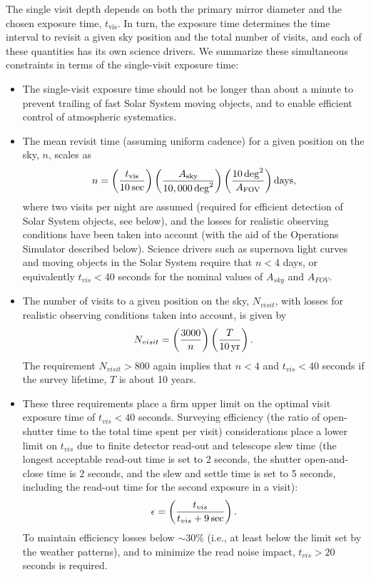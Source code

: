The single visit depth depends on both the primary mirror diameter and the
chosen exposure time, $t_\mathrm{vis}$. In turn, the exposure time
determines the time interval to revisit a given sky position and the total
number of visits, and each of these quantities has its own science
drivers. We summarize these simultaneous constraints in terms of the
single-visit exposure time:
\begin{itemize}
\item  The single-visit exposure time should not be longer than about a minute to
         prevent trailing of fast Solar System moving objects, and to enable efficient
         control of atmospheric systematics.
\item  The mean revisit time (assuming uniform cadence) for a given position
         on the sky, $n$, scales as
\begin{equation}
  n = \left( {t_\mathrm{vis} \over 10  \, \mathrm{sec}} \right)
      \left( { A_\mathrm{sky} \over 10,000  \, \mathrm{deg}^2} \right)
      \left( {10 \, \mathrm{deg}^2 \over  A_\mathrm{FOV}} \right) \mathrm{days},
\end{equation}
where two visits per night are assumed (required for efficient detection of
Solar System objects, see below), and the losses for realistic observing conditions
have been taken into account (with the aid of the Operations Simulator described below).
Science drivers such as supernova light curves and moving objects in the Solar System require
that $n<4$ days, or equivalently $t_{vis} < 40$ seconds for the nominal values
of $A_{sky} $ and $A_{FOV}$.
\item  The number of visits to a given position on the sky, $N_{visit}$,
with losses for realistic observing conditions taken into account,
is given by
\begin{equation}
      N_{visit} = \left( {3000 \over n} \right)
                    \left( { T \over 10 \, \mathrm{yr}} \right).
\end{equation}
The requirement $N_{visit}>800$ again implies that $n<4$ and
$t_{vis} < 40$ seconds if the survey lifetime, $T$ is about 10 years.
\item  These three requirements place a firm upper limit on the
optimal visit exposure time of $t_{vis} < 40$ seconds. Surveying
efficiency (the ratio of open-shutter time to the total
time spent per visit) considerations place a lower limit on
$t_{vis}$ due to finite detector read-out and telescope slew time (the longest
acceptable read-out time is set to 2 seconds, the shutter open-and-close
time is 2 seconds, and the slew and settle time is set to 5 seconds, including
the read-out time for the second exposure in a visit):
\begin{equation}
      \epsilon = \left( {t_{vis} \over t_{vis} + 9 \, \mathrm{sec}}\right).
\end{equation}
To maintain efficiency losses below $\sim$30\% (i.e., at least below the
limit set by the weather patterns), and to minimize the read noise
impact, $t_{vis} > 20$ seconds is required.
\end{itemize}

